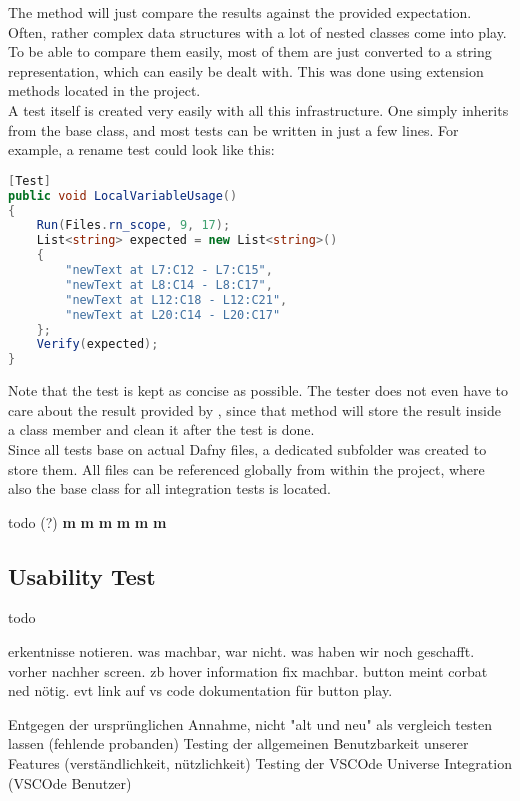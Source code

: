 The  method will just compare the results against the provided expectation.
Often, rather complex data structures with a lot of nested classes come into play.
To be able to compare them easily, most of them are just converted to a string representation, which can easily be dealt with.
This was done using extension methods located in the  project.\\

A test itself is created very easily with all this infrastructure.
One simply inherits from the base class, and most tests can be written in just a few lines.
For example, a rename test could look like this:

\begin{lstlisting}[language=csharp, caption={Sample Integration Test}, captionpos=b, label={lst:sampleintegrationtest}]
[Test]
public void LocalVariableUsage()
{
    Run(Files.rn_scope, 9, 17);
    List<string> expected = new List<string>()
    {
        "newText at L7:C12 - L7:C15",
        "newText at L8:C14 - L8:C17",
        "newText at L12:C18 - L12:C21",
        "newText at L20:C14 - L20:C17"
    };
    Verify(expected);
}
\end{lstlisting}

Note that the test is kept as concise as possible.
The tester does not even have to care about the result provided by , since that method will store the result inside a class member and clean it after the test is done.\\

Since all tests base on actual Dafny files, a dedicated subfolder was created to store them.
All files can be referenced globally from within the  project, where also the base class for all integration tests is located.



todo (?)
\textbf{m}
\textbf{m}
\textbf{m}
\textbf{m}
\textbf{m}
\textbf{m}


\subsection{Usability Test}

todo

erkentnisse notieren. was machbar, war nicht. was haben wir noch geschafft. vorher nachher screen.
zb hover information fix machbar. button meint corbat ned nötig. evt link auf vs code dokumentation für button play.

Entgegen der ursprünglichen Annahme, nicht "alt und neu" als vergleich testen lassen (fehlende probanden)
Testing der allgemeinen Benutzbarkeit unserer Features (verständlichkeit, nützlichkeit)
Testing der VSCOde Universe Integration (VSCOde Benutzer)

